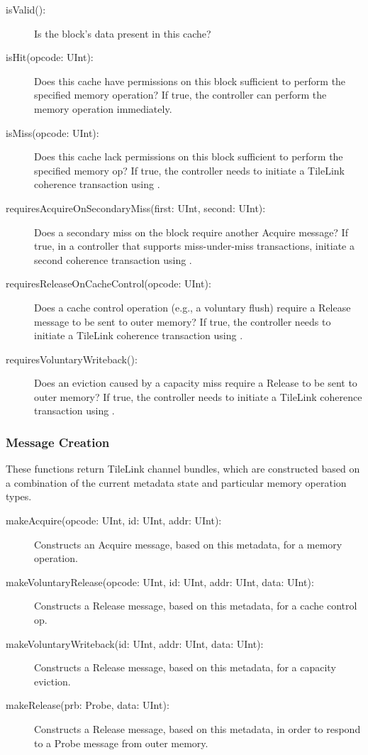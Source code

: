 \begin{description}
\item[isValid():]
Is the block's data present in this cache?
\item[isHit(opcode: UInt):]
Does this cache have permissions on this block sufficient to perform the specified memory operation?
If true, the controller can perform the memory operation immediately.
\item[isMiss(opcode: UInt):]
Does this cache lack permissions on this block sufficient to perform the specified memory op?
If true, the controller needs to initiate a TileLink coherence transaction using .
\item[requiresAcquireOnSecondaryMiss(first: UInt, second: UInt):]
Does a secondary miss on the block require another Acquire message?
If true, in a controller that supports miss-under-miss transactions, initiate a second coherence transaction using .
\item[requiresReleaseOnCacheControl(opcode: UInt):]
Does a cache control operation (e.g., a voluntary flush) require a Release message to be sent to outer memory?
If true, the controller needs to initiate a TileLink coherence transaction using .
\item[requiresVoluntaryWriteback():]
Does an eviction caused by a capacity miss require a Release to be sent to outer memory?
If true, the controller needs to initiate a TileLink coherence transaction using .
\end{description}


\subsubsection{Message Creation}

These functions return TileLink channel bundles,
which are constructed  based on a combination of the current metadata state
and particular memory operation types.

\begin{description}
\item[makeAcquire(opcode: UInt, id: UInt, addr: UInt):]
Constructs an Acquire message, based on this metadata, for a memory operation.
\item[makeVoluntaryRelease(opcode: UInt, id: UInt, addr: UInt, data: UInt):]
Constructs a Release message, based on this metadata, for a cache control op.
\item[makeVoluntaryWriteback(id: UInt, addr: UInt, data: UInt):]
Constructs a Release message, based on this metadata, for a capacity eviction.
\item[makeRelease(prb: Probe, data: UInt):]
Constructs a Release message, based on this metadata, in order to respond to a Probe message from outer memory.
\end{description}


